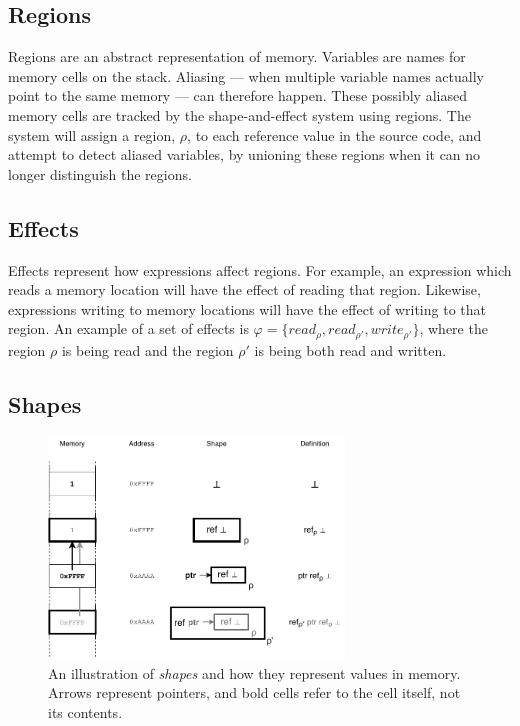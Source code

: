 \subsection{Regions}
Regions are an abstract representation of memory. Variables are names for memory cells on the stack. Aliasing --- when multiple variable names actually point to the same memory --- can therefore happen. These possibly aliased memory cells are tracked by the shape-and-effect system using regions. The system will assign a region, $\rho$, to each reference value in the source code, and attempt to detect aliased variables, by unioning these regions when it can no longer distinguish the regions.

\subsection{Effects}
Effects represent how expressions affect regions. For example, an expression which reads a memory location will have the effect of reading that region. Likewise, expressions writing to memory locations will have the effect of writing to that region. An example of a set of effects is $\varphi = \{read_\rho , read_{\rho'} , write_{\rho'}\}$, where the region $\rho$ is being read and the region $\rho'$ is being both read and written.

\subsection{Shapes}
\begin{figure}[H]
    \centering
    \includegraphics[width=0.7\textwidth]{background/figures/shapes}
    \caption{An illustration of \textit{shapes} and how they represent values in memory. Arrows represent pointers, and bold cells refer to the cell itself, not its contents.}
    \label{shapes-figure}
\end{figure}

